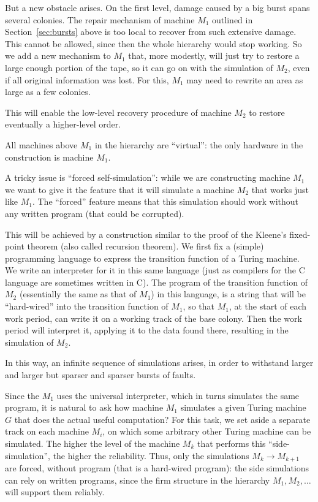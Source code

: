 \documentclass[12pt]{memoir}
\begin{document}
But a new obstacle arises.
On the first level, damage caused by a big burst spans several colonies.
The repair mechanism of machine $M_1$ outlined in Section~\ref{sec:bursts} above 
is too local to recover from such extensive damage.
This cannot be allowed, since then the whole hierarchy would stop working.
So we add a new mechanism to \( M_{1} \) that, more modestly,
will just try to restore a large enough portion of the
tape, so it can go on with the simulation of $M_2$, even if all 
original information was lost.
For this, \( M_{1} \) may need to rewrite an area as large as a few colonies.

This will enable the low-level recovery procedure of 
machine $M_{2}$ to restore eventually a higher-level order.

All machines above $M_1$ in the hierarchy are
``virtual'': the only hardware in the construction is machine $M_1$.

A tricky issue is ``forced self-simulation'': while we are constructing machine $M_1$
we want to give it the feature that it will simulate a machine \( M_{2} \) that
works just like \( M_{1} \).
The ``forced'' feature means that this simulation should
work without any written program (that could be corrupted).

This will be achieved by
a construction similar to the proof of the Kleene's fixed-point 
theorem (also called recursion theorem).
We first fix a (simple) programming language to express the transition
function of a Turing machine.
We write an interpreter for it in this same language (just as compilers for the 
C language are sometimes written in C).
The program of the transition function of \( M_{2} \)
(essentially the same as that of \( M_{1} \))
in this language, is a string that will be
``hard-wired'' into the transition function of \( M_{1} \), 
so that \( M_{1} \), at the start of each work period, can write
it on a working track of the base colony.
Then the work period will interpret it, 
applying it to the data found there, resulting
in the simulation of \( M_{2} \).

In this way, an infinite sequence of simulations arises, in order
to withstand larger and larger but sparser and sparser bursts of faults.

Since the $M_1$ uses the universal interpreter, which in turns
simulates the same program, it is natural to ask
how  machine $M_1$ simulates a given Turing machine $G$ that does the 
actual useful computation?
For this task, we set aside a separate track 
on each machine $M_i$, on which some arbitrary other Turing machine can be
simulated.
The higher the level of the machine \( M_{k} \) that performs this
``side-simulation'', the higher the reliability.
Thus, only the simulations \( M_{k}\to M_{k+1} \) are forced, without program
(that is a hard-wired program):
the side simulations can rely on written programs, since the firm
structure in the hierarchy \( M_{1},M_{2},\dots \) will support them reliably.
\end{document}

